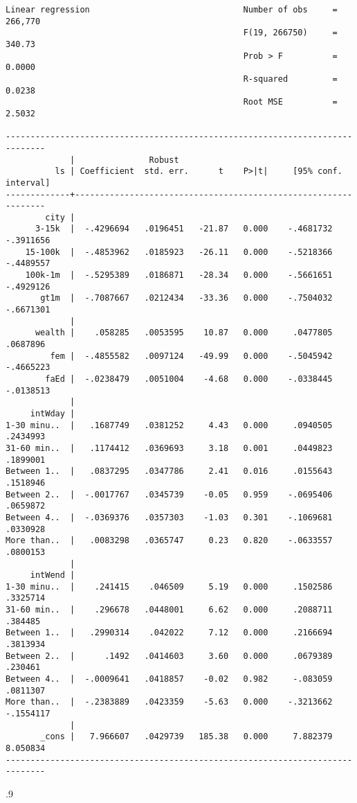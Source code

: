 \documentclass[10pt, letterpaper]{article}
\begin{document}
\begin{spacing}{1.4}
\begin{spacing}{.5}
\begin{scriptsize}
\begin{verbatim}
Linear regression                               Number of obs     =    266,770
                                                F(19, 266750)     =     340.73
                                                Prob > F          =     0.0000
                                                R-squared         =     0.0238
                                                Root MSE          =     2.5032

------------------------------------------------------------------------------
             |               Robust
          ls | Coefficient  std. err.      t    P>|t|     [95% conf. interval]
-------------+----------------------------------------------------------------
        city |
      3-15k  |  -.4296694   .0196451   -21.87   0.000    -.4681732   -.3911656
    15-100k  |  -.4853962   .0185923   -26.11   0.000    -.5218366   -.4489557
    100k-1m  |  -.5295389   .0186871   -28.34   0.000    -.5661651   -.4929126
       gt1m  |  -.7087667   .0212434   -33.36   0.000    -.7504032   -.6671301
             |
      wealth |    .058285   .0053595    10.87   0.000     .0477805    .0687896
         fem |  -.4855582   .0097124   -49.99   0.000    -.5045942   -.4665223
        faEd |  -.0238479   .0051004    -4.68   0.000    -.0338445   -.0138513
             |
     intWday |
1-30 minu..  |   .1687749   .0381252     4.43   0.000     .0940505    .2434993
31-60 min..  |   .1174412   .0369693     3.18   0.001     .0449823    .1899001
Between 1..  |   .0837295   .0347786     2.41   0.016     .0155643    .1518946
Between 2..  |  -.0017767   .0345739    -0.05   0.959    -.0695406    .0659872
Between 4..  |  -.0369376   .0357303    -1.03   0.301    -.1069681    .0330928
More than..  |   .0083298   .0365747     0.23   0.820    -.0633557    .0800153
             |
     intWend |
1-30 minu..  |    .241415    .046509     5.19   0.000     .1502586    .3325714
31-60 min..  |    .296678   .0448001     6.62   0.000     .2088711     .384485
Between 1..  |   .2990314    .042022     7.12   0.000     .2166694    .3813934
Between 2..  |      .1492   .0414603     3.60   0.000     .0679389     .230461
Between 4..  |  -.0009641   .0418857    -0.02   0.982     -.083059    .0811307
More than..  |  -.2383889   .0423359    -5.63   0.000    -.3213662   -.1554117
             |
       _cons |   7.966607   .0429739   185.38   0.000     7.882379    8.050834
------------------------------------------------------------------------------
\end{verbatim}
\end{scriptsize}
\end{spacing}{.9}




\end{spacing}
\end{document}
